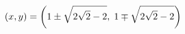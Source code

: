 \documentclass[preview]{standalone}
\begin{document}
\begin{align*}
\special{dvisvgm:raw <g id='unique000'>}(x,y)=\left(1\pm\sqrt{2\sqrt2-2},\;1\mp\sqrt{2\sqrt2-2}\right)\special{dvisvgm:raw </g>}
\end{align*}
\end{document}
